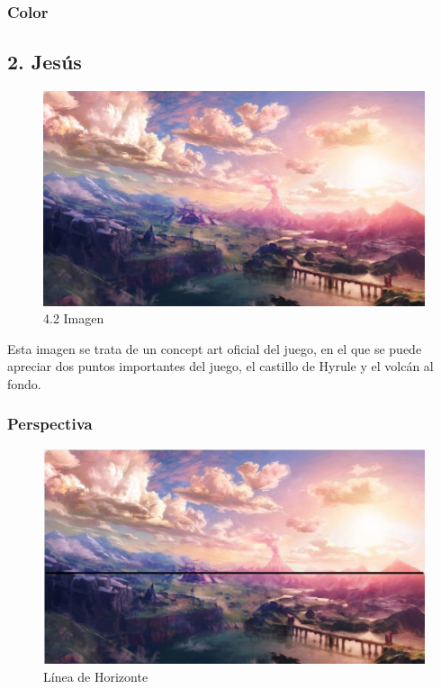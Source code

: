 \documentclass[12pt]{article}
\begin{document}
        \subsubsection{Color}
        \newpage


    \subsection{2. Jesús}

        \begin{figure}[H]
          \centering
          \includegraphics[scale = 0.2]{images/Concepts/2_concept_art.jpg}
          \caption{\small{4.2 Imagen}}
        \end{figure}
        
        Esta imagen se trata de un concept art oficial del juego, en el que se puede apreciar dos puntos importantes del juego, el castillo de Hyrule y el volcán al fondo. 

        \subsubsection{Perspectiva}
        \begin{figure}[H]
          \centering
          \includegraphics[scale = 0.4]{Jesus/Seccion2/Group 4.JPEG}
          \caption{Línea de Horizonte}
        \end{figure}
\end{document}
